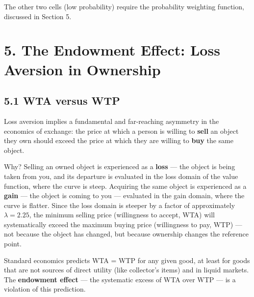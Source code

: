 \documentclass[12pt, letterpaper]{article}
\begin{document}
The other two cells (low probability) require the probability weighting function, discussed in Section 5.

\medskip


\section{5. The Endowment Effect: Loss Aversion in Ownership}



\subsection{5.1 WTA versus WTP}


Loss aversion implies a fundamental and far-reaching asymmetry in the economics of exchange: the price at which a person is willing to \textbf{sell} an object they own should exceed the price at which they are willing to \textbf{buy} the same object.

Why? Selling an owned object is experienced as a \textbf{loss} --- the object is being taken from you, and its departure is evaluated in the loss domain of the value function, where the curve is steep. Acquiring the same object is experienced as a \textbf{gain} --- the object is coming to you --- evaluated in the gain domain, where the curve is flatter. Since the loss domain is steeper by a factor of approximately $\lambda = 2.25$, the minimum selling price (willingness to accept, WTA) will systematically exceed the maximum buying price (willingness to pay, WTP) --- not because the object has changed, but because ownership changes the reference point.

Standard economics predicts WTA = WTP for any given good, at least for goods that are not sources of direct utility (like collector's items) and in liquid markets. The \textbf{endowment effect} --- the systematic excess of WTA over WTP --- is a violation of this prediction.
\end{document}
